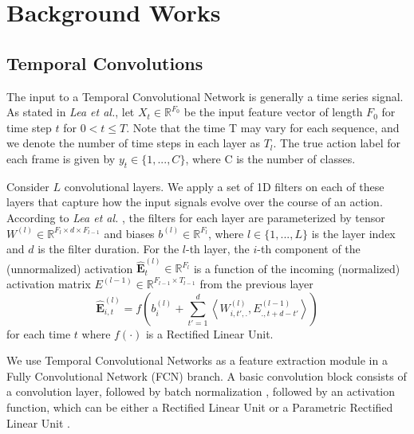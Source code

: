 \documentclass[article]{IEEEtran}
\begin{document}
 















\section{Background Works}
\label{Background Works}
\subsection{Temporal Convolutions}
The input to a Temporal Convolutional Network is generally a time series signal. As stated in \textit{Lea et al.}\cite{Lea_2016}, let $X_{t} \in \mathbb{R}^{F_0}$ be the input feature vector of length $F_0$ for time step $t$ for $0 < t \leq T$. Note that the time T may vary for each sequence, and we denote the number of time steps in each layer as $T_l$. The true action label for each frame is given by $y_t \in \{1, . . . , C\}$, where C is the number of classes.

Consider $L$ convolutional layers. We apply a set of 1D filters on each of these layers that capture how the input signals evolve over the course of an action. According to \textit{Lea et al.} \cite{Lea_2016}, the filters for each layer are parameterized by tensor $W^{(l)} \in \mathbb{R}^{F_l \times d \times F_{l-1}} $ and biases $b^{(l)} \in \mathbb{R}^{F_l}$, where $l \in \{1, . . . , L\}$ is the layer index and $d$ is the filter duration. For the $l$-th layer, the $i$-th component of the (unnormalized) activation ${\mathbf {\hat{E}}}^{(l)}_{t} \in \mathbb{R}^{F_{l}}$ is a function of the incoming (normalized) activation matrix $E^{(l-1)} \in \mathbb{R}^{F_{l-1} \times T_{l-1}}$ from the previous layer 
\begin{equation}
{\mathbf {\hat{E}}}_{i, t}^{(l)} = f\left(b_{i}^{(l)} + \sum_{t'=1}^{d} \left< W_{i, t', .}^{(l)}, E_{., t+d-t'}^{(l-1)} \right> \right)
\end{equation}
for each time $t$ where $f(\cdot)$ is a Rectified Linear Unit.

We use Temporal Convolutional Networks as a feature extraction module in a Fully Convolutional Network (FCN) branch. A basic convolution block consists of a convolution layer, followed by batch normalization \cite{ioffe2015batch}, followed by an activation function, which can be either a Rectified Linear Unit or a Parametric Rectified Linear Unit \cite{Trottier2016}.
\end{document}
